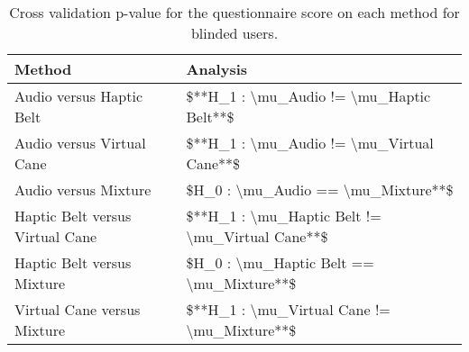 
\begin{table}[!htb]
\centering
\caption{Cross validation p-value for the questionnaire score on each method for blinded users.}
\label{tab:lsd_sagat}
\begin{tabular}{ll}
\toprule
                         Method &                                        Analysis \\
\midrule
       Audio versus Haptic Belt &        \$**H\_1 : \textbackslash mu\_Audio != \textbackslash mu\_Haptic Belt**\$ \\
      Audio versus Virtual Cane &       \$**H\_1 : \textbackslash mu\_Audio != \textbackslash mu\_Virtual Cane**\$ \\
           Audio versus Mixture &              \$H\_0 : \textbackslash mu\_Audio == \textbackslash mu\_Mixture**\$ \\
Haptic Belt versus Virtual Cane & \$**H\_1 : \textbackslash mu\_Haptic Belt != \textbackslash mu\_Virtual Cane**\$ \\
     Haptic Belt versus Mixture &        \$H\_0 : \textbackslash mu\_Haptic Belt == \textbackslash mu\_Mixture**\$ \\
    Virtual Cane versus Mixture &     \$**H\_1 : \textbackslash mu\_Virtual Cane != \textbackslash mu\_Mixture**\$ \\
\bottomrule
\end{tabular}
\end{table}

